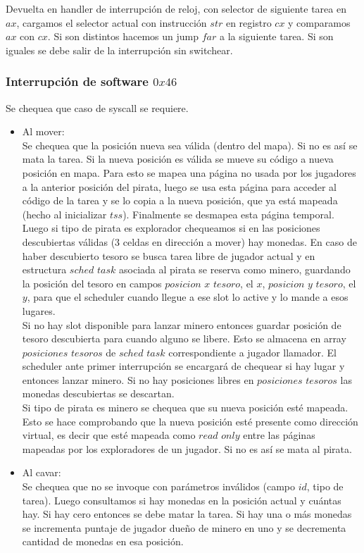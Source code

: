 Devuelta en handler de interrupción de reloj, con selector de siguiente tarea en $ax$, cargamos el selector actual
con instrucción $str$ en registro $cx$ y comparamos $ax$ con $cx$. Si son distintos hacemos un jump $far$ a
la siguiente tarea. Si son iguales se debe salir de la interrupción sin switchear. 


\subsubsection{Interrupción de software $0x46$}
Se chequea que caso de syscall se requiere. 
\begin{itemize}
\item Al mover:\\
Se chequea que la posición nueva sea válida (dentro del mapa). Si no es así se mata la tarea.
Si la nueva posición es válida se mueve su código a nueva posición en mapa. Para esto se mapea una página no usada por los jugadores a la anterior posición del pirata, luego se usa esta página para acceder al código de la tarea 
y se lo copia a la nueva posición, que ya está mapeada (hecho al inicializar $tss$). Finalmente se desmapea
esta página temporal.\\
Luego si tipo de pirata es explorador chequeamos si en las posiciones descubiertas válidas (3 celdas en dirección 
a mover) hay monedas. En caso de haber descubierto tesoro se busca tarea libre de jugador actual y en
estructura $sched$ $task$ asociada al pirata se reserva como minero, guardando la posición del tesoro
en campos $posicion$ $x$ $tesoro$, el $x$, $posicion$ $y$ $tesoro$, el $y$, para que el scheduler cuando llegue a 
ese slot lo active y lo mande a esos lugares.\\
Si no hay slot disponible para lanzar minero entonces guardar posición de tesoro descubierta 
para cuando alguno se libere. Esto se almacena en array $posiciones$ $tesoros$ de $sched$ $task$ correspondiente 
a jugador llamador. El scheduler ante primer interrupción se encargará de chequear si hay
lugar y entonces lanzar minero. Si no hay posiciones libres en $posiciones$ $tesoros$ las monedas descubiertas se descartan.\\
Si tipo de pirata es minero se chequea que su nueva posición esté mapeada. Esto se hace comprobando que la nueva 
posición esté presente como dirección virtual, es decir que esté mapeada como $read$ $only$ entre las páginas mapeadas por los exploradores de un jugador. Si no es así se mata al pirata.
	
\item Al cavar:\\
Se chequea que no se invoque con parámetros inválidos (campo $id$, tipo de tarea). Luego consultamos si hay 
monedas en la posición actual y cuántas hay. Si hay cero entonces se debe matar la tarea. Si hay una o más 
monedas se incrementa puntaje de jugador dueño de minero en uno y se decrementa cantidad de monedas en esa
posición. 


\end{itemize}
